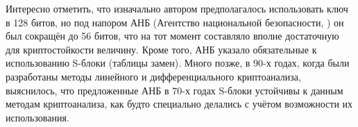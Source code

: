Интересно отметить, что изначально автором предполагалось использовать ключ в 128 битов, но под напором АНБ (Агентство национальной безопасности, ) он был сокращён до 56 битов, что на тот момент составляло вполне достаточную для криптостойкости величину. Кроме того, АНБ указало обязательные к использованию S-блоки (таблицы замен). Много позже, в 90-х годах, когда были разработаны методы линейного и дифференциального криптоанализа, выяснилось, что предложенные АНБ в 70-х годах S-блоки устойчивы к данным методам криптоанализа, как будто специально делались с учётом возможности их использования.

